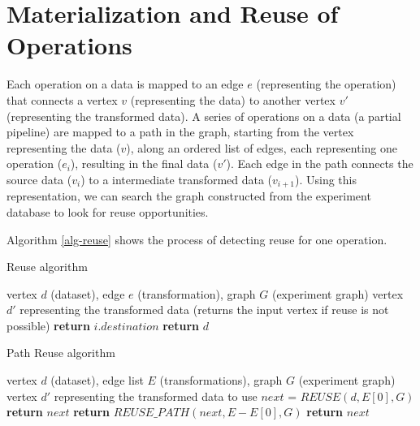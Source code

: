 \section{Materialization and Reuse of Operations}\label{sec-materializaiton-and-reuse}

Each operation on a data is mapped to an edge $e$ (representing the operation) that connects a vertex $v$ (representing the data) to another vertex $v'$ (representing the transformed data).
A series of operations on a data (a partial pipeline) are mapped to a path in the graph, starting from the vertex representing the data ($v$), along an ordered list of edges, each representing one operation ($e_i$), resulting in the final data ($v'$). 
Each edge in the path connects the source data ($v_i$) to a intermediate transformed data ($v_{i+1}$).
Using this representation, we can search the graph constructed from the experiment database to look for reuse opportunities.

Algorithm \ref{alg-reuse} shows the process of detecting reuse for one operation.
\begin{algorithm}
\caption{Reuse algorithm}\label{alg-reuse}
\begin{algorithmic}[1]
\Require vertex $d$ (dataset), edge $e$ (transformation), graph $G$ (experiment graph)
\Ensure vertex $d'$ representing the transformed data (returns the input vertex if reuse is not possible)
			 	 
			 		 \State \textbf{return} $i.destination$ 
			 	\EndIf
		\EndFor
	\EndIf
   \State \textbf{return} $d$ 
\EndFunction
\end{algorithmic}
\end{algorithm}

 
\begin{algorithm}
\caption{Path Reuse algorithm}\label{alg-reuse-partial_pipeline}
\begin{algorithmic}[1]
\Require vertex $d$ (dataset), edge list $E$ (transformations), graph $G$ (experiment graph)
\Ensure vertex $d'$ representing the transformed data to use
	\State $next$ = $REUSE(d, E[0],G)$
		\State \textbf{return} $next$
		\State \textbf{return} $REUSE\_PATH(next, E - E[0], G)$
	\Else
		\State \textbf{return} $next$
	\EndIf
\EndFunction
\end{algorithmic}
\end{algorithm}
 
